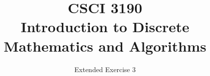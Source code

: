 \documentclass{../../cls/sig-alternate-05-2015}
\begin{document}






%

\title{CSCI 3190 \\ Introduction to Discrete Mathematics and Algorithms}
\subtitle{Extended Exercise 3}

\maketitle
\begin{abstract}

\end{abstract}

\keywords{}
\end{document}

